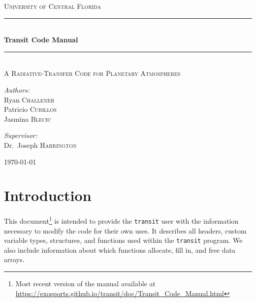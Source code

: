 \documentclass[letterpaper,12pt]{article}
\begin{document}
\begin{titlepage}
\begin{center}

\textsc{\LARGE University of Central Florida}\\[1.5cm]

\rule{\linewidth}{0.5mm} \\[0.4cm]
{ \huge \bfseries Transit Code Manual \\[0.4cm] }
\rule{\linewidth}{0.5mm} \\[1.0cm]

\textsc{\Large A Radiative-Transfer Code for Planetary Atmospheres}\\[1.5cm]

\noindent
\begin{minipage}{0.4\textwidth}
\begin{flushleft} \large
\emph{Authors:}\\
Ryan     \textsc{Challener} \\
Patricio \textsc{Cubillos}\\
Jasmina  \textsc{Blecic}  \\
\end{flushleft}
\end{minipage}%
\begin{minipage}{0.4\textwidth}
\begin{flushright} \large
\emph{Supervisor:} \\
Dr.~Joseph \textsc{Harrington}\\ \vspace{1.2cm}
\end{flushright}
\end{minipage}

\vfill

{\large \today}

\end{center}
\end{titlepage}


\section{Introduction}
\label{sec:intro}
This document\footnote{Most recent version of the manual available at 
\href{https://exosports.github.io/transit/doc/Transit_Code_Manual.html}{https://exosports.github.io/transit/doc/Transit\_Code\_Manual.html}} 
is intended to provide the \texttt{transit} user with the information necessary to modify the code for their own uses. It describes all headers, custom variable types, structures, and functions used within the \texttt{transit} program. We also include information about which functions allocate, fill in, and free data arrays. 
\end{document}
